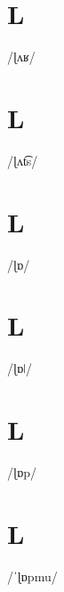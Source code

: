 \documentclass[10pt,a4paper,twoside]{book}
\begin{document}
\section*{L}

\begin{multicols}{3}
 {/ɭʌʁ/} {}
\end{multicols}

\section*{L}

\begin{multicols}{3}
 {/ɭʌt͡s/} {}
\end{multicols}

\section*{L}

\begin{multicols}{3}
 {/ɭɒ/} {}
\end{multicols}

\section*{L}

\begin{multicols}{3}
 {/ɭɒǀ/} {}
\end{multicols}

\section*{L}

\begin{multicols}{3}
 {/ɭɒp/} {}
\end{multicols}

\section*{L}

\begin{multicols}{3}
 {/ˈɭɒpmu/} {}
\end{multicols}
\end{document}
